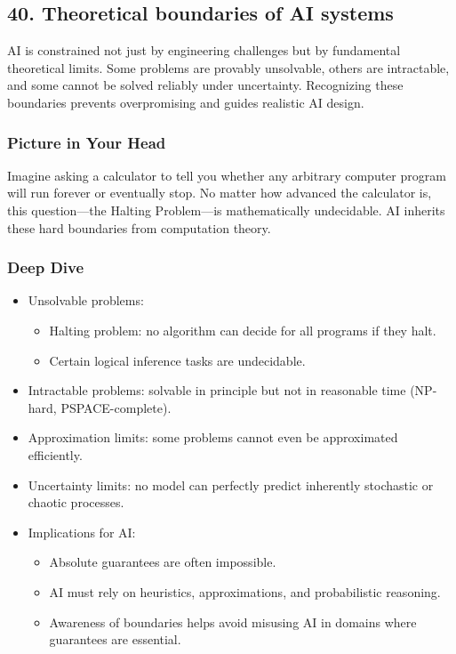 \documentclass[
  letterpaper,
  DIV=11,
  numbers=noendperiod]{scrreprt}
\providecommand{\tightlist}{%
  \setlength{\itemsep}{0pt}\setlength{\parskip}{0pt}}
\begin{document}
\subsection{40. Theoretical boundaries of AI
systems}\label{theoretical-boundaries-of-ai-systems}

AI is constrained not just by engineering challenges but by fundamental
theoretical limits. Some problems are provably unsolvable, others are
intractable, and some cannot be solved reliably under uncertainty.
Recognizing these boundaries prevents overpromising and guides realistic
AI design.

\subsubsection{Picture in Your Head}\label{picture-in-your-head-39}

Imagine asking a calculator to tell you whether any arbitrary computer
program will run forever or eventually stop. No matter how advanced the
calculator is, this question---the Halting Problem---is mathematically
undecidable. AI inherits these hard boundaries from computation theory.

\subsubsection{Deep Dive}\label{deep-dive-39}

\begin{itemize}
\item
  Unsolvable problems:

  \begin{itemize}
  \tightlist
  \item
    Halting problem: no algorithm can decide for all programs if they
    halt.
  \item
    Certain logical inference tasks are undecidable.
  \end{itemize}
\item
  Intractable problems: solvable in principle but not in reasonable time
  (NP-hard, PSPACE-complete).
\item
  Approximation limits: some problems cannot even be approximated
  efficiently.
\item
  Uncertainty limits: no model can perfectly predict inherently
  stochastic or chaotic processes.
\item
  Implications for AI:

  \begin{itemize}
  \tightlist
  \item
    Absolute guarantees are often impossible.
  \item
    AI must rely on heuristics, approximations, and probabilistic
    reasoning.
  \item
    Awareness of boundaries helps avoid misusing AI in domains where
    guarantees are essential.
  \end{itemize}
\end{itemize}
\end{document}
